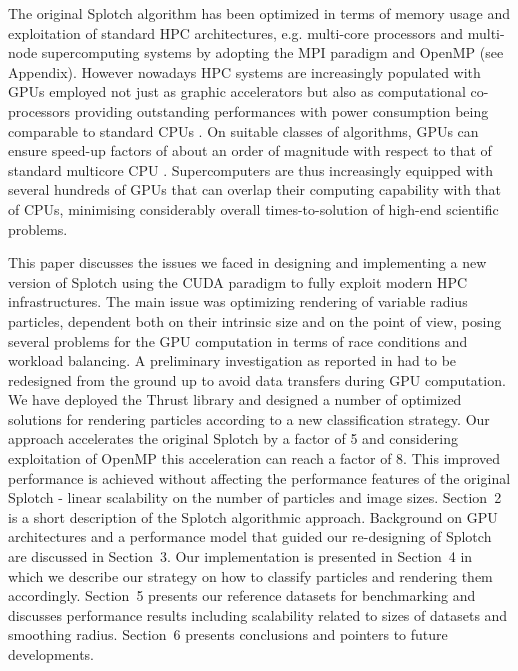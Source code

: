 \documentclass[1p]{elsarticle}
\begin{document}

The original Splotch algorithm has been optimized in terms of memory usage and exploitation of standard HPC architectures, e.g. multi-core processors and multi-node supercomputing systems by adopting the MPI paradigm \cite{jin:high-performance} and OpenMP (see Appendix). However nowadays HPC systems are increasingly populated with GPUs employed not just as graphic accelerators but also as computational co-processors providing outstanding performances with power consumption being comparable to standard CPUs \cite{}. On suitable classes of algorithms, GPUs can ensure speed-up factors of about an order of magnitude with respect to that of standard multicore CPU \cite{}. Supercomputers are thus increasingly equipped with several hundreds of GPUs that can overlap their computing capability with that of CPUs, minimising considerably overall times-to-solution of high-end scientific problems.

This paper discusses the issues we faced in designing and implementing a new version of Splotch using the CUDA paradigm to fully exploit modern HPC infrastructures. The main issue was optimizing rendering of variable radius particles, dependent both on their intrinsic size and on the point of view, posing several problems for the GPU computation in terms of race conditions and workload balancing. A preliminary investigation as reported in \cite{jin:high-performance} had to be redesigned from the ground up to avoid data transfers during GPU computation. We have deployed the Thrust library \cite{thrusturl} and designed a number of optimized solutions for rendering particles according to a new classification strategy. Our approach accelerates the original Splotch by a factor of 5 and considering exploitation of OpenMP this acceleration can reach a factor of 8.  This improved performance is achieved without affecting the performance features of the original Splotch - linear scalability on the number of particles and image sizes. Section~2 is a short description of the Splotch algorithmic approach. Background on GPU architectures and a performance model that guided our re-designing of Splotch are discussed in Section~3. Our implementation is presented in Section~4 in which we describe our strategy on how to classify particles and rendering them accordingly. Section~5 presents our reference datasets for benchmarking and discusses performance results including scalability related to sizes of datasets and smoothing radius. Section~6 presents conclusions and pointers to future developments.
\end{document}
